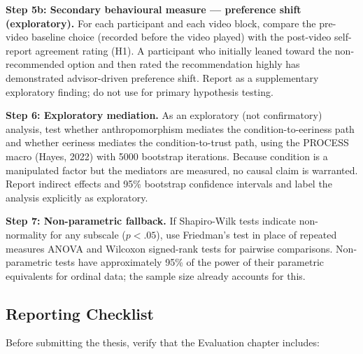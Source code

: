 \documentclass[11pt, a4paper]{article}
\begin{document}
\textbf{Step 5b: Secondary behavioural measure --- preference shift (exploratory).} For each participant and each video block, compare the pre-video baseline choice (recorded before the video played) with the post-video self-report agreement rating (H1). A participant who initially leaned toward the non-recommended option and then rated the recommendation highly has demonstrated advisor-driven preference shift. Report as a supplementary exploratory finding; do not use for primary hypothesis testing.

\textbf{Step 6: Exploratory mediation.} As an exploratory (not confirmatory) analysis, test whether anthropomorphism mediates the condition-to-eeriness path and whether eeriness mediates the condition-to-trust path, using the PROCESS macro (Hayes, 2022) with 5000 bootstrap iterations. Because condition is a manipulated factor but the mediators are measured, no causal claim is warranted. Report indirect effects and 95\% bootstrap confidence intervals and label the analysis explicitly as exploratory.

\textbf{Step 7: Non-parametric fallback.} If Shapiro-Wilk tests indicate non-normality for any subscale ($p < .05$), use Friedman's test in place of repeated measures ANOVA and Wilcoxon signed-rank tests for pairwise comparisons. Non-parametric tests have approximately 95\% of the power of their parametric equivalents for ordinal data; the sample size already accounts for this.


\subsection{Reporting Checklist}

Before submitting the thesis, verify that the Evaluation chapter includes:
\end{document}
